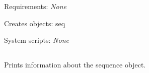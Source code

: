 \begin{description}
\begin{enumerate}
\end{enumerate}


\item{Requirements:} {\em None}


\item{Creates objects:} seq


\item{System scripts:} {\em None}

\end{description}




\subsection[seq\_info]{  }



Prints information about the sequence object.


